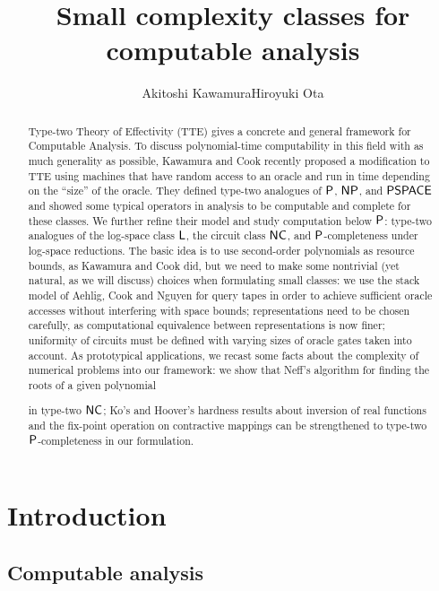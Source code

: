 \documentclass[envcountsame,orivec,oribibl]{llncs}
\title{Small complexity classes for computable analysis}
\author{Akitoshi Kawamura\qquad\qquad Hiroyuki Ota}
\institute{University of Tokyo}
\begin{document}
\maketitle

\begin{abstract}
Type-two Theory of Effectivity (TTE) gives a concrete and general framework for 
Computable Analysis. 
To discuss polynomial-time computability 
in this field with as much generality as possible, 
Kawamura and Cook recently proposed a modification to TTE using 
machines that have random access to an oracle and 
run in time depending on the ``size'' of the oracle. 
They defined type-two analogues of 
$\mathsf{P}$, $\mathsf{NP}$, and $\mathsf{PSPACE}$ 
and showed some typical operators in analysis
to be computable and complete for these classes. 
We further refine their model and study computation below $\mathsf{P}$: 
type-two analogues of 
the log-space class $\mathsf{L}$, 
the circuit class $\mathsf{NC}$, 
and $\mathsf{P}$-completeness under log-space reductions.
The basic idea is 
to use second-order polynomials as resource bounds, 
as Kawamura and Cook did, 
but we need to make some nontrivial (yet natural, as we will discuss) choices
when formulating small classes: 
we use the stack model of Aehlig, Cook and Nguyen for query tapes 
in order to achieve 
sufficient oracle accesses without interfering with space bounds; 
representations need to be chosen carefully, as 
computational equivalence between representations is now finer; 
uniformity of circuits must be defined 
with varying sizes of oracle gates taken into account. 
As prototypical applications, 
we recast some facts about the complexity of numerical problems 
into our framework: 
we show that Neff's algorithm for finding the roots of a given polynomial 

in type-two $\mathsf{NC}$; 
Ko's and Hoover's hardness results about 
inversion of real functions and the fix-point operation on contractive mappings
can be strengthened to type-two $\mathsf{P}$-completeness in our formulation. 
\end{abstract}

\section{Introduction}

\subsection{Computable analysis}
\end{document}
